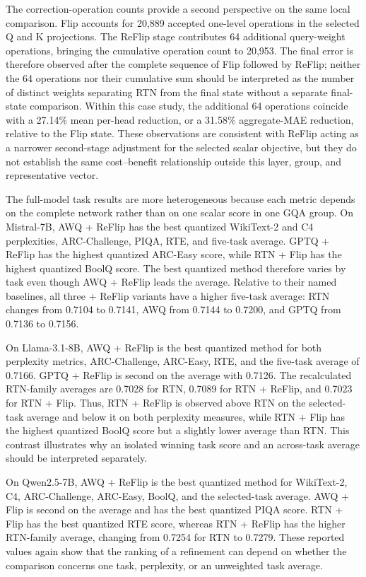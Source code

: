 \documentclass[../main.tex]{subfiles}
\begin{document}
The correction-operation counts provide a second perspective on the same local comparison. Flip accounts for 20,889 accepted one-level operations in the selected Q and K projections. The ReFlip stage contributes 64 additional query-weight operations, bringing the cumulative operation count to 20,953. The final error is therefore observed after the complete sequence of Flip followed by ReFlip; neither the 64 operations nor their cumulative sum should be interpreted as the number of distinct weights separating RTN from the final state without a separate final-state comparison. Within this case study, the additional 64 operations coincide with a 27.14\% mean per-head reduction, or a 31.58\% aggregate-MAE reduction, relative to the Flip state. These observations are consistent with ReFlip acting as a narrower second-stage adjustment for the selected scalar objective, but they do not establish the same cost--benefit relationship outside this layer, group, and representative vector.

The full-model task results are more heterogeneous because each metric depends on the complete network rather than on one scalar score in one GQA group. On Mistral-7B, AWQ + ReFlip has the best quantized WikiText-2 and C4 perplexities, ARC-Challenge, PIQA, RTE, and five-task average. GPTQ + ReFlip has the highest quantized ARC-Easy score, while RTN + Flip has the highest quantized BoolQ score. The best quantized method therefore varies by task even though AWQ + ReFlip leads the average. Relative to their named baselines, all three + ReFlip variants have a higher five-task average: RTN changes from 0.7104 to 0.7141, AWQ from 0.7144 to 0.7200, and GPTQ from 0.7136 to 0.7156.

On Llama-3.1-8B, AWQ + ReFlip is the best quantized method for both perplexity metrics, ARC-Challenge, ARC-Easy, RTE, and the five-task average of 0.7166. GPTQ + ReFlip is second on the average with 0.7126. The recalculated RTN-family averages are 0.7028 for RTN, 0.7089 for RTN + ReFlip, and 0.7023 for RTN + Flip. Thus, RTN + ReFlip is observed above RTN on the selected-task average and below it on both perplexity measures, while RTN + Flip has the highest quantized BoolQ score but a slightly lower average than RTN. This contrast illustrates why an isolated winning task score and an across-task average should be interpreted separately.

On Qwen2.5-7B, AWQ + ReFlip is the best quantized method for WikiText-2, C4, ARC-Challenge, ARC-Easy, BoolQ, and the selected-task average. AWQ + Flip is second on the average and has the best quantized PIQA score. RTN + Flip has the best quantized RTE score, whereas RTN + ReFlip has the higher RTN-family average, changing from 0.7254 for RTN to 0.7279. These reported values again show that the ranking of a refinement can depend on whether the comparison concerns one task, perplexity, or an unweighted task average.
\end{document}
